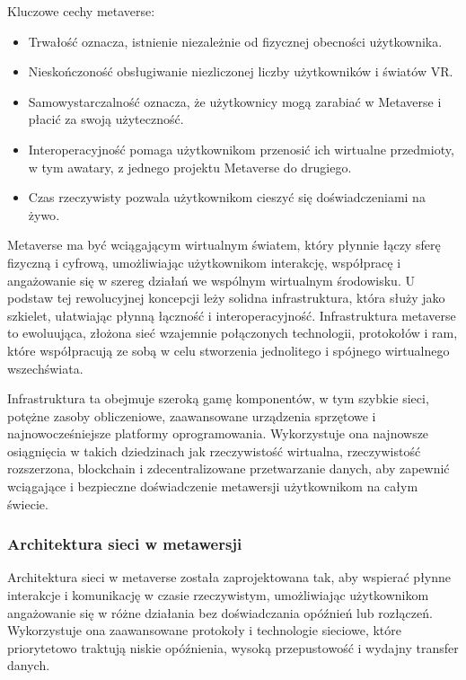 Kluczowe cechy metaverse:

\begin{itemize}
    \item Trwałość oznacza, istnienie niezależnie od fizycznej obecności użytkownika\cite{metaverseUseCaseslee}.
    \item Nieskończoność obsługiwanie niezliczonej liczby użytkowników i światów VR\cite{metaverseUseCaseslee}.
    \item Samowystarczalność oznacza, że użytkownicy mogą zarabiać w Metaverse i płacić za swoją użyteczność\cite{metaverseUseCaseslee}.
    \item Interoperacyjność pomaga użytkownikom przenosić ich wirtualne przedmioty, w tym awatary, z jednego projektu Metaverse do drugiego\cite{metaverseUseCaseslee}.
    \item Czas rzeczywisty pozwala użytkownikom cieszyć się doświadczeniami na żywo\cite{metaverseUseCaseslee}.
\end{itemize}


Metaverse ma być wciągającym wirtualnym światem, który płynnie łączy sferę fizyczną i cyfrową, umożliwiając użytkownikom interakcję, współpracę i angażowanie się w szereg działań we wspólnym wirtualnym środowisku. U podstaw tej rewolucyjnej koncepcji leży solidna infrastruktura, która służy jako szkielet, ułatwiając płynną łączność i interoperacyjność. Infrastruktura metaverse to ewoluująca, złożona sieć wzajemnie połączonych technologii, protokołów i ram, które współpracują ze sobą w celu stworzenia jednolitego i spójnego wirtualnego wszechświata\cite{metaverseInfrastructureIEEE}.

Infrastruktura ta obejmuje szeroką gamę komponentów, w tym szybkie sieci, potężne zasoby obliczeniowe, zaawansowane urządzenia sprzętowe i najnowocześniejsze platformy oprogramowania. Wykorzystuje ona najnowsze osiągnięcia w takich dziedzinach jak rzeczywistość wirtualna, rzeczywistość rozszerzona, blockchain i zdecentralizowane przetwarzanie danych, aby zapewnić wciągające i bezpieczne doświadczenie metawersji użytkownikom na całym świecie\cite{metaverseInfrastructureIEEE}.

\subsubsection{Architektura sieci w metawersji}

Architektura sieci w metaverse została zaprojektowana tak, aby wspierać płynne interakcje i komunikację w czasie rzeczywistym, umożliwiając użytkownikom angażowanie się w różne działania bez doświadczania opóźnień lub rozłączeń. Wykorzystuje ona zaawansowane protokoły i technologie sieciowe, które priorytetowo traktują niskie opóźnienia, wysoką przepustowość i wydajny transfer danych\cite{metaverseInfrastructureIEEE}.


